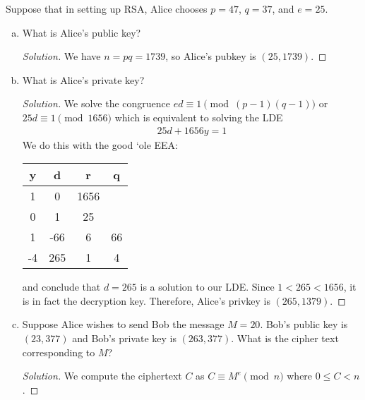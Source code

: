 \question Suppose that in setting up RSA, Alice chooses $p = 47$, $q = 37$, and $e = 25$.
\begin{enumerate}[(a)]
  \item What is Alice's public key?
        \begin{proof}[Solution]
          We have $n = pq = 1739$, so Alice's pubkey is $(25, 1739)$.
        \end{proof}
  \item What is Alice's private key?
        \begin{proof}[Solution]
          We solve the congruence $ed \equiv 1 \pmod{(p-1)(q-1)}$ or $25d \equiv 1 \pmod{1656}$
          which is equivalent to solving the LDE
          \begin{align*}
            25d + 1656y = 1
          \end{align*}
          We do this with the good `ole EEA\@:
          \begin{center}
            \begin{tabular}{C|C|C|C}
              y  & d   & r    & q  \\   & 0   & 1656      \\
              0  & 1   & 25        \\
              1  & -66 & 6    & 66 \\
              -4 & 265 & 1    & 4
            \end{tabular}
          \end{center}
          and conclude that $d=265$ is a solution to our LDE\@.
          Since $1 < 265 < 1656$, it is in fact the decryption key.
          Therefore, Alice's privkey is $(265,1379)$.
        \end{proof}
  \item Suppose Alice wishes to send Bob the message $M = 20$.
        Bob's public key is $(23, 377)$ and Bob’s private key is $(263, 377)$.
        What is the cipher text corresponding to $M$?
        \begin{proof}[Solution]
          We compute the ciphertext $C$ as $C \equiv M^e \pmod{n}$ where $0 \leq C < n$.


\end{proof}
\end{enumerate}
